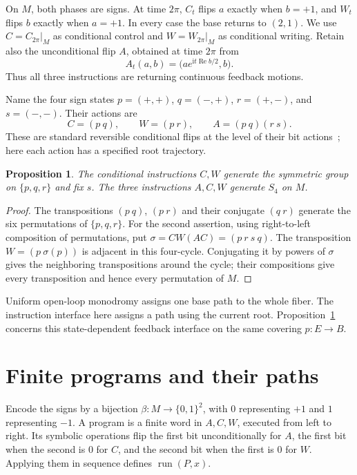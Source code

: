 \documentclass[11pt]{article}
\newtheorem{proposition}{Proposition}
\begin{document}
On $M$, both phases are signs. At time $2\pi$, $C_t$ flips $a$ exactly when
$b=+1$, and $W_t$ flips $b$ exactly when $a=+1$. In every case the base
returns to $(2,1)$. We use $C=C_{2\pi}|_M$ as conditional control and
$W=W_{2\pi}|_M$ as conditional writing. Retain also the unconditional flip
$A$, obtained at time $2\pi$ from
\[
 A_t(a,b)=\bigl(ae^{\mathrm i t\operatorname{Re}b/2},b\bigr).
\]
Thus all three instructions are returning continuous feedback motions.

Name the four sign states
$p=(+,+)$, $q=(-,+)$, $r=(+,-)$, and $s=(-,-)$. Their actions are
\begin{equation}\label{eq:gates}
 C=(p\ q),\qquad W=(p\ r),\qquad A=(p\ q)(r\ s).
\end{equation}
These are standard reversible conditional flips at the level of their bit
actions~\cite{toffoli}; here each action has a specified root trajectory.

\begin{proposition}\label{prop:gates}
The conditional instructions $C,W$ generate the symmetric group on
$\{p,q,r\}$ and fix $s$. The three instructions $A,C,W$ generate $S_4$ on $M$.
\end{proposition}
\begin{proof}
The transpositions $(p\ q)$, $(p\ r)$ and their conjugate $(q\ r)$ generate
the six permutations of $\{p,q,r\}$. For the second assertion, using
right-to-left composition of permutations, put
$\sigma=CW(AC)=(p\ r\ s\ q)$. The transposition $W=(p\ \sigma(p))$
is adjacent in this four-cycle. Conjugating it by powers of $\sigma$ gives
the neighboring transpositions around the cycle; their compositions give
every transposition and hence every permutation of $M$.
\end{proof}

Uniform open-loop monodromy assigns one base path to the whole fiber.
The instruction interface here assigns a path using the current root.
Proposition~\ref{prop:gates} concerns this state-dependent feedback interface
on the same covering $p:E\to B$.

\section{Finite programs and their paths}

Encode the signs by a bijection $\beta:M\to\{0,1\}^2$, with $0$ representing
$+1$ and $1$ representing $-1$. A program is a finite word in $A,C,W$,
executed from left to right. Its symbolic operations flip the first bit
unconditionally for $A$, the first bit when the second is $0$ for $C$, and
the second bit when the first is $0$ for $W$. Applying them in sequence
defines $\operatorname{run}(P,x)$.
\end{document}

